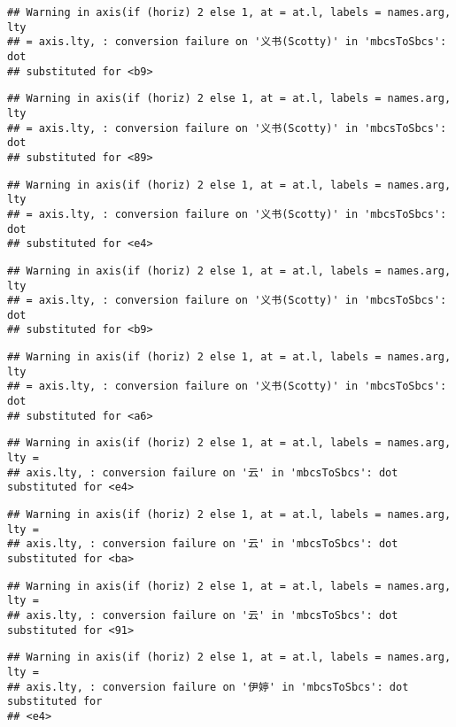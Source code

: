 \documentclass[
]{article}
\begin{document}
\begin{verbatim}
## Warning in axis(if (horiz) 2 else 1, at = at.l, labels = names.arg, lty
## = axis.lty, : conversion failure on '义书(Scotty)' in 'mbcsToSbcs': dot
## substituted for <b9>
\end{verbatim}

\begin{verbatim}
## Warning in axis(if (horiz) 2 else 1, at = at.l, labels = names.arg, lty
## = axis.lty, : conversion failure on '义书(Scotty)' in 'mbcsToSbcs': dot
## substituted for <89>
\end{verbatim}

\begin{verbatim}
## Warning in axis(if (horiz) 2 else 1, at = at.l, labels = names.arg, lty
## = axis.lty, : conversion failure on '义书(Scotty)' in 'mbcsToSbcs': dot
## substituted for <e4>
\end{verbatim}

\begin{verbatim}
## Warning in axis(if (horiz) 2 else 1, at = at.l, labels = names.arg, lty
## = axis.lty, : conversion failure on '义书(Scotty)' in 'mbcsToSbcs': dot
## substituted for <b9>
\end{verbatim}

\begin{verbatim}
## Warning in axis(if (horiz) 2 else 1, at = at.l, labels = names.arg, lty
## = axis.lty, : conversion failure on '义书(Scotty)' in 'mbcsToSbcs': dot
## substituted for <a6>
\end{verbatim}

\begin{verbatim}
## Warning in axis(if (horiz) 2 else 1, at = at.l, labels = names.arg, lty =
## axis.lty, : conversion failure on '云' in 'mbcsToSbcs': dot substituted for <e4>
\end{verbatim}

\begin{verbatim}
## Warning in axis(if (horiz) 2 else 1, at = at.l, labels = names.arg, lty =
## axis.lty, : conversion failure on '云' in 'mbcsToSbcs': dot substituted for <ba>
\end{verbatim}

\begin{verbatim}
## Warning in axis(if (horiz) 2 else 1, at = at.l, labels = names.arg, lty =
## axis.lty, : conversion failure on '云' in 'mbcsToSbcs': dot substituted for <91>
\end{verbatim}

\begin{verbatim}
## Warning in axis(if (horiz) 2 else 1, at = at.l, labels = names.arg, lty =
## axis.lty, : conversion failure on '伊婷' in 'mbcsToSbcs': dot substituted for
## <e4>
\end{verbatim}
\end{document}
